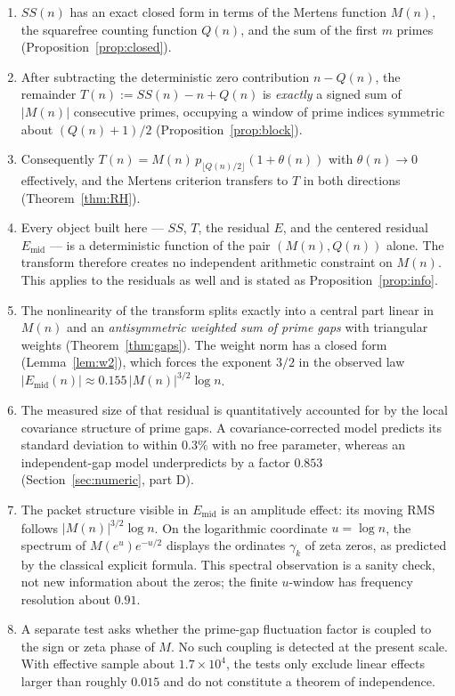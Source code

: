 \documentclass[11pt]{amsart}
\numberwithin{equation}{section}
\theoremstyle{plain}
\theoremstyle{definition}
\theoremstyle{remark}
\newcommand{\Mert}{M}
\newcommand{\Sq}{Q}
\begin{document}
\begin{enumerate}[label=(\roman*)]
\item $SS(n)$ has an exact closed form in terms of the Mertens function
$\Mert(n)$, the squarefree counting function $\Sq(n)$, and the sum of the first
$m$ primes (Proposition~\ref{prop:closed}).
\item After subtracting the deterministic zero contribution $n-\Sq(n)$, the
remainder $T(n):=SS(n)-n+\Sq(n)$ is \emph{exactly} a signed sum of $|\Mert(n)|$
consecutive primes, occupying a window of prime indices symmetric about
$(\Sq(n)+1)/2$ (Proposition~\ref{prop:block}).
\item Consequently $T(n)=\Mert(n)\,p_{\lfloor \Sq(n)/2\rfloor}(1+\theta(n))$
with $\theta(n)\to0$ effectively, and the Mertens criterion transfers to $T$ in
both directions (Theorem~\ref{thm:RH}).
\item Every object built here --- $SS$, $T$, the residual $E$, and the centered
residual $E_{\mathrm{mid}}$ --- is a deterministic function of the pair
$(\Mert(n),\Sq(n))$ alone. The transform therefore creates no independent
arithmetic constraint on $\Mert(n)$. This applies to the residuals as well and
is stated as Proposition~\ref{prop:info}.
\item The nonlinearity of the transform splits exactly into a central part
linear in $\Mert(n)$ and an \emph{antisymmetric weighted sum of prime gaps}
with triangular weights (Theorem~\ref{thm:gaps}). The weight norm has a closed
form (Lemma~\ref{lem:w2}), which forces the exponent $3/2$ in the observed law
$|E_{\mathrm{mid}}(n)|\approx0.155\,|\Mert(n)|^{3/2}\log n$.
\item The measured size of that residual is quantitatively accounted for by the
local covariance structure of prime gaps. A covariance-corrected model predicts
its standard deviation to within $0.3\%$ with no free parameter, whereas an
independent-gap model underpredicts by a factor $0.853$
(Section~\ref{sec:numeric}, part D).
\item The packet structure visible in $E_{\mathrm{mid}}$ is an amplitude effect:
its moving RMS follows $|M(n)|^{3/2}\log n$. On the logarithmic coordinate
$u=\log n$, the spectrum of $M(e^u)e^{-u/2}$ displays the ordinates $\gamma_k$
of zeta zeros, as predicted by the classical explicit formula. This spectral
observation is a sanity check, not new information about the zeros; the finite
$u$-window has frequency resolution about $0.91$.
\item A separate test asks whether the prime-gap fluctuation factor is coupled to
the sign or zeta phase of $M$. No such coupling is detected at the present
scale. With effective sample about $1.7\times10^4$, the tests only exclude
linear effects larger than roughly $0.015$ and do not constitute a theorem of
independence.
\end{enumerate}
\end{document}
